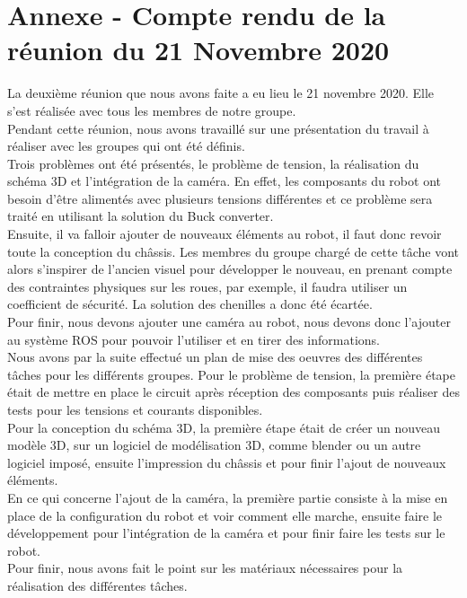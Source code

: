 \documentclass{PackagerQualityN}
\begin{document}
\section*{Annexe - Compte rendu de la réunion du 21 Novembre 2020}
La deuxième réunion que nous avons faite a eu lieu le 21 novembre 2020. Elle s'est réalisée avec tous les membres de notre groupe.\\ Pendant cette réunion, nous avons travaillé sur une présentation du travail à réaliser avec les groupes qui ont été définis.\\ Trois problèmes ont été présentés, le problème de tension, la réalisation du schéma 3D et l'intégration de la caméra.
En effet, les composants du robot ont besoin d’être alimentés avec plusieurs tensions différentes et ce problème sera traité en utilisant la solution du Buck converter.
\\
Ensuite, il va falloir ajouter de nouveaux éléments au robot, il faut donc revoir toute la conception du châssis.
Les membres du groupe chargé de cette tâche vont alors s’inspirer de l’ancien visuel pour développer le nouveau, en prenant compte des contraintes physiques sur les roues, par exemple, il faudra utiliser un coefficient de sécurité.
La solution des chenilles a donc été écartée.
\\
Pour finir, nous devons ajouter une caméra au robot, nous devons donc l’ajouter au système ROS pour pouvoir l’utiliser et en tirer des informations.
\\
Nous avons par la suite effectué un plan de mise des oeuvres des différentes tâches pour les différents groupes.
Pour le problème de tension, la première étape était de mettre en place le circuit après réception des composants puis réaliser des tests pour les tensions et courants disponibles.
\\
Pour la conception du schéma 3D, la première étape était de créer un nouveau modèle 3D, sur un logiciel de modélisation 3D, comme blender ou un autre logiciel imposé, ensuite l'impression du châssis et pour finir l'ajout de nouveaux éléments.
\\
En ce qui concerne l'ajout de la caméra, la première partie consiste à la mise en place de la configuration du robot et voir comment elle marche, ensuite faire le développement pour l'intégration de la caméra et pour finir faire les tests sur le robot.
\\
Pour finir, nous avons fait le point sur les matériaux nécessaires pour la réalisation des différentes tâches.

\newp
\end{document}
